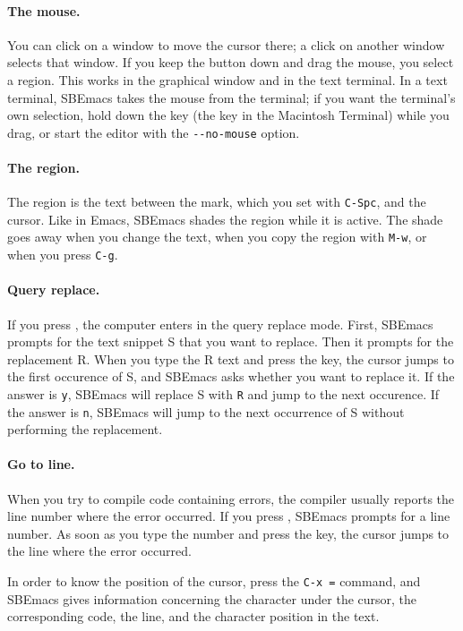 \documentclass[a4paper,12pt,openany]{book}
\begin{document}
\paragraph{The mouse.} You can click on a window to move
the cursor there; a click on another window selects that window.
If you keep the button down and drag the mouse, you select a region.
This works in the graphical window and in the text terminal.
In a text terminal, SBEmacs takes the mouse from the terminal; if
you want the terminal's own selection, hold down the 
key (the  key in the Macintosh Terminal) while
you drag, or start the editor with the \verb|--no-mouse| option.

\paragraph{The region.} The region is the text between the mark,
which you set with \verb|C-Spc|, and the cursor. Like in Emacs,
SBEmacs shades the region while it is active. The shade goes away
when you change the text, when you copy the region with \verb|M-w|,
or when you press \verb|C-g|.

\paragraph{Query replace.} If you press ,
the computer enters in the query replace mode.
First, SBEmacs prompts for the text snippet S
that you want to replace. Then it prompts for
the replacement R. When you type the R text and
press the  key, the cursor jumps to
the first occurence of S, and SBEmacs
asks whether you want to
replace it. If the answer is
\verb|y|, SBEmacs will replace S
with \verb|R| and jump to the next occurence.
If the answer is \verb|n|, SBEmacs will
jump to the next occurrence of S without
performing the replacement.

\paragraph{Go to line.} When you try to compile
code containing errors, the compiler
usually reports the line number where the error occurred.
If you press , SBEmacs
prompts for a line number. As soon as you
type the number and press the 
key, the cursor jumps to the line where the
error occurred.

In order to know the position of the cursor,
press the \verb|C-x =| command,
and SBEmacs gives information concerning
the character under the
cursor, the corresponding code, the line,
and the character position in the text.
\end{document}
